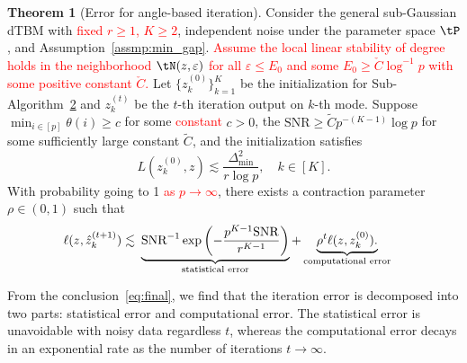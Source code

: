 \documentclass[lettersize,onecolumn,journal]{IEEEtran}
\theoremstyle{definition}
\newtheorem{thm}{Theorem}
\theoremstyle{definition}
\newcommand{\of}[1]{\left(#1\right)}
\newcommand*{\KeepStyleUnderBrace}[1]{%
  \mathop{%
    \mathchoice
    {\underbrace{\displaystyle#1}}%
    {\underbrace{\textstyle#1}}%
    {\underbrace{\scriptstyle#1}}%
    {\underbrace{\scriptscriptstyle#1}}%
  }\limits
}
\def\fixme#1#2{\textbf{\color{red}[FIXME (#1): #2]}}
\begin{document}
{
\color{blue}


\begin{thm}[Error for angle-based iteration]\label{thm:refinement} Consider the general sub-Gaussian dTBM with \textcolor{red}{fixed $r \geq 1$, $K \geq 2$}, independent noise under the parameter space $\tP$, and Assumption~\ref{assmp:min_gap}. \textcolor{red}{Assume the local linear stability of degree holds in the neighborhood $\tN(z,\varepsilon)$ for all $\varepsilon \leq E_0$ and some $E_0 \geq \check{C}\log^{-1}p $ with some positive constant $\check{C}$.}
Let $\{z^{(0)}_k\}_{k=1}^K$ be the initialization for Sub-Algorithm~\hyperref[alg:main]{2} and $z^{(t)}_k$ be the $t$-th iteration output on $k$-th mode. Suppose $\min_{i \in [p]}\theta(i) \geq c $ for some \textcolor{red}{constant} $c > 0$, the $\text{SNR} \geq \tilde C p^{-(K-1)}\log p$ for some sufficiently large constant $\tilde C$, and the initialization satisfies 
\begin{equation}
    L(z^{(0)}_k, z) \lesssim \frac{\Delta_{\min}^2}{r \log p}, \quad k \in [K].
\end{equation}
 With probability going to 1 \textcolor{red}{as $p \rightarrow \infty$}, there exists a contraction parameter $\rho \in (0,1)$ such that 
\begin{align}\label{eq:final}
    \ell(z, \hat z^{(t+1)}_k) \lesssim &\ \KeepStyleUnderBrace{
   \text{SNR}^{-1}
    \exp\of{- \frac{p^{K-1}\text{SNR}}{r^{K-1}}}}_{\substack{\text{statistical error}} }+ \KeepStyleUnderBrace{ \rho^t \ell(z, z^{(0)}_k). }_{\substack{\text{computational error}}}
\end{align}
\end{thm}
From the conclusion~\eqref{eq:final}, we find that the iteration error is decomposed into two parts: statistical error and computational error. The statistical error is unavoidable with noisy data regardless $t$, whereas the computational error decays in an exponential rate as the number of iterations $t \rightarrow \infty$. 


}
\end{document}
